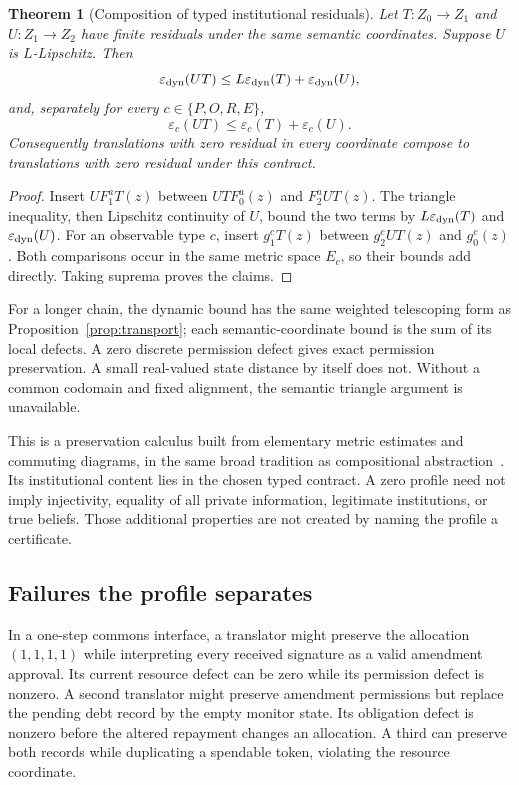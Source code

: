 \documentclass[11pt,letterpaper]{article}
\theoremstyle{plain}
\newtheorem{theorem}[proposition]{Theorem}
\theoremstyle{definition}
\theoremstyle{remark}
\begin{document}
\begin{theorem}[Composition of typed institutional residuals]\label{thm:residual}
Let $T:Z_0\to Z_1$ and $U:Z_1\to Z_2$ have finite residuals under the same semantic coordinates. Suppose $U$ is $L$-Lipschitz. Then
\[
\varepsilon_{\rm dyn}(UT)
\leq L\varepsilon_{\rm dyn}(T)+\varepsilon_{\rm dyn}(U),
\]
and, separately for every $c\in\{P,O,R,E\}$,
\[
\varepsilon_c(UT)\leq\varepsilon_c(T)+\varepsilon_c(U).
\]
Consequently translations with zero residual in every coordinate compose to translations with zero residual under this contract.
\end{theorem}
\begin{proof}
Insert $UF_1^aT(z)$ between $UTF_0^a(z)$ and $F_2^aUT(z)$. The triangle inequality, then Lipschitz continuity of $U$, bound the two terms by $L\varepsilon_{\rm dyn}(T)$ and $\varepsilon_{\rm dyn}(U)$. For an observable type $c$, insert $g_1^cT(z)$ between $g_2^cUT(z)$ and $g_0^c(z)$. Both comparisons occur in the same metric space $E_c$, so their bounds add directly. Taking suprema proves the claims.
\end{proof}

For a longer chain, the dynamic bound has the same weighted telescoping form as Proposition~\ref{prop:transport}; each semantic-coordinate bound is the sum of its local defects. A zero discrete permission defect gives exact permission preservation. A small real-valued state distance by itself does not. Without a common codomain and fixed alignment, the semantic triangle argument is unavailable.

This is a preservation calculus built from elementary metric estimates and commuting diagrams, in the same broad tradition as compositional abstraction~\cite{rischel}. Its institutional content lies in the chosen typed contract. A zero profile need not imply injectivity, equality of all private information, legitimate institutions, or true beliefs. Those additional properties are not created by naming the profile a certificate.

\subsection{Failures the profile separates}
In a one-step commons interface, a translator might preserve the allocation $(1,1,1,1)$ while interpreting every received signature as a valid amendment approval. Its current resource defect can be zero while its permission defect is nonzero. A second translator might preserve amendment permissions but replace the pending debt record by the empty monitor state. Its obligation defect is nonzero before the altered repayment changes an allocation. A third can preserve both records while duplicating a spendable token, violating the resource coordinate.
\end{document}
